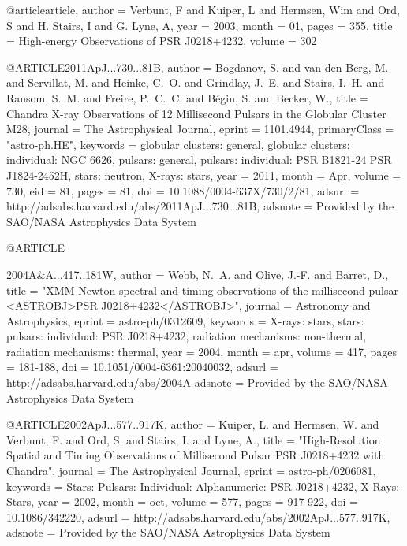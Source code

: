 {{@article{article,
author = {Verbunt, F and Kuiper, L and Hermsen, Wim and Ord, S and H. Stairs, I and G. Lyne, A},
year = {2003},
month = {01},
pages = {355},
title = {High-energy Observations of PSR J0218+4232},
volume = {302}
}


@ARTICLE{2011ApJ...730...81B,
   author = {{Bogdanov}, S. and {van den Berg}, M. and {Servillat}, M. and 
	{Heinke}, C.~O. and {Grindlay}, J.~E. and {Stairs}, I.~H. and 
	{Ransom}, S.~M. and {Freire}, P.~C.~C. and {B{\'e}gin}, S. and 
	{Becker}, W.},
    title = {Chandra X-ray Observations of 12 Millisecond Pulsars in the Globular Cluster M28},
  journal = {The Astrophysical Journal},
   eprint = {1101.4944},
 primaryClass = "astro-ph.HE",
 keywords = {globular clusters: general, globular clusters: individual: NGC 6626, pulsars: general, pulsars: individual: PSR B1821-24 PSR J1824-2452H, stars: neutron, X-rays: stars},
     year = {2011},
    month = {Apr},
   volume = {730},
      eid = {81},
    pages = {81},
      doi = {10.1088/0004-637X/730/2/81},
   adsurl = {http://adsabs.harvard.edu/abs/2011ApJ...730...81B},
  adsnote = {Provided by the SAO/NASA Astrophysics Data System}
}


@ARTICLE{2004A&A...417..181W,
   author = {{Webb}, N.~A. and {Olive}, J.-F. and {Barret}, D.},
    title = "{XMM-Newton spectral and timing observations of the millisecond pulsar <ASTROBJ>PSR J0218+4232</ASTROBJ>}",
  journal = {Astronomy and Astrophysics},
   eprint = {astro-ph/0312609},
 keywords = {X-rays: stars, stars: pulsars: individual: PSR J0218+4232, radiation mechanisms: non-thermal, radiation mechanisms: thermal},
     year = 2004,
    month = apr,
   volume = 417,
    pages = {181-188},
      doi = {10.1051/0004-6361:20040032},
   adsurl = {http://adsabs.harvard.edu/abs/2004A%
  adsnote = {Provided by the SAO/NASA Astrophysics Data System}
}


@ARTICLE{2002ApJ...577..917K,
   author = {{Kuiper}, L. and {Hermsen}, W. and {Verbunt}, F. and {Ord}, S. and 
	{Stairs}, I. and {Lyne}, A.},
    title = "{High-Resolution Spatial and Timing Observations of Millisecond Pulsar PSR J0218+4232 with Chandra}",
  journal = {The Astrophysical Journal},
   eprint = {astro-ph/0206081},
 keywords = {Stars: Pulsars: Individual: Alphanumeric: PSR J0218+4232, X-Rays: Stars},
     year = 2002,
    month = oct,
   volume = 577,
    pages = {917-922},
      doi = {10.1086/342220},
   adsurl = {http://adsabs.harvard.edu/abs/2002ApJ...577..917K},
  adsnote = {Provided by the SAO/NASA Astrophysics Data System}
}


}}}
